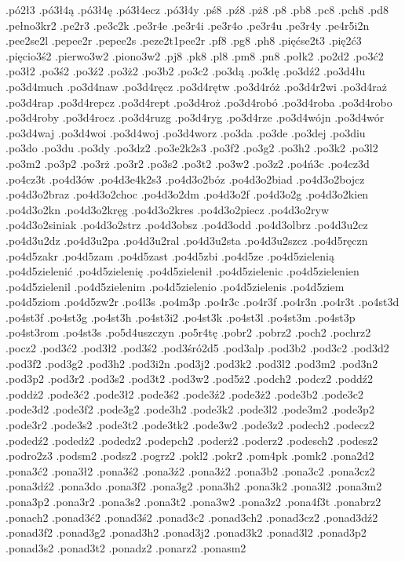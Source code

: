 {.pó2ł3
.pó3ł4ą
.pó3ł4ę
.pó3ł4ecz
.pó3ł4y
.pś8
.pź8
.pż8
.p8
.pb8
.pc8
.pch8
.pd8
.pełno3kr2
.pe2r3
.pe3c2k
.pe3r4e
.pe3r4i
.pe3r4o
.pe3r4u
.pe3r4y
.pe4r5i2n
.pee2se2l
.pepee2r
.pepee2s
.peze2t1pee2r
.pf8
.pg8
.ph8
.pięćse2t3
.pię2ć3
.pięcio3ś2
.pierwo3w2
.piono3w2
.pj8
.pk8
.pl8
.pm8
.pn8
.połk2
.po2d2
.po3ć2
.po3ł2
.po3ś2
.po3ź2
.po3ż2
.po3b2
.po3c2
.po3dą
.po3dę
.po3dź2
.po3d4łu
.po3d4much
.po3d4naw
.po3d4ręcz
.po3d4rętw
.po3d4róż
.po3d4r2wi
.po3d4raż
.po3d4rap
.po3d4repcz
.po3d4rept
.po3d4roż
.po3d4robó
.po3d4roba
.po3d4robo
.po3d4roby
.po3d4rocz
.po3d4ruzg
.po3d4ryg
.po3d4rze
.po3d4wójn
.po3d4wór
.po3d4waj
.po3d4woi
.po3d4woj
.po3d4worz
.po3da
.po3de
.po3dej
.po3diu
.po3do
.po3du
.po3dy
.po3dz2
.po3e2k2s3
.po3f2
.po3g2
.po3h2
.po3k2
.po3l2
.po3m2
.po3p2
.po3rż
.po3r2
.po3s2
.po3t2
.po3w2
.po3z2
.po4ń3c
.po4cz3d
.po4cz3t
.po4d3ów
.po4d3e4k2s3
.po4d3o2bóz
.po4d3o2biad
.po4d3o2bojcz
.po4d3o2braz
.po4d3o2choc
.po4d3o2dm
.po4d3o2f
.po4d3o2g
.po4d3o2kien
.po4d3o2kn
.po4d3o2kręg
.po4d3o2kres
.po4d3o2piecz
.po4d3o2ryw
.po4d3o2siniak
.po4d3o2strz
.po4d3obsz
.po4d3odd
.po4d3olbrz
.po4d3u2cz
.po4d3u2dz
.po4d3u2pa
.po4d3u2ral
.po4d3u2sta
.po4d3u2szcz
.po4d5ręczn
.po4d5zakr
.po4d5zam
.po4d5zast
.po4d5zbi
.po4d5ze
.po4d5zielenią
.po4d5zielenić
.po4d5zielenię
.po4d5zielenił
.po4d5zielenic
.po4d5zielenien
.po4d5zielenil
.po4d5zielenim
.po4d5zielenio
.po4d5zielenis
.po4d5ziem
.po4d5ziom
.po4d5zw2r
.po4l3s
.po4m3p
.po4r3c
.po4r3f
.po4r3n
.po4r3t
.po4st3d
.po4st3f
.po4st3g
.po4st3h
.po4st3i2
.po4st3k
.po4st3l
.po4st3m
.po4st3p
.po4st3rom
.po4st3s
.po5d4uszczyn
.po5r4tę
.pobr2
.pobrz2
.poch2
.pochrz2
.pocz2
.pod3ć2
.pod3ł2
.pod3ś2
.pod3śró2d5
.pod3alp
.pod3b2
.pod3c2
.pod3d2
.pod3f2
.pod3g2
.pod3h2
.pod3i2n
.pod3j2
.pod3k2
.pod3l2
.pod3m2
.pod3n2
.pod3p2
.pod3r2
.pod3s2
.pod3t2
.pod3w2
.pod5ż2
.podch2
.podcz2
.poddź2
.poddż2
.pode3ć2
.pode3ł2
.pode3ś2
.pode3ź2
.pode3ż2
.pode3b2
.pode3c2
.pode3d2
.pode3f2
.pode3g2
.pode3h2
.pode3k2
.pode3l2
.pode3m2
.pode3p2
.pode3r2
.pode3s2
.pode3t2
.pode3tk2
.pode3w2
.pode3z2
.podech2
.podecz2
.podedź2
.podedż2
.podedz2
.podepch2
.poderż2
.poderz2
.podesch2
.podesz2
.podro2z3
.podsm2
.podsz2
.pogrz2
.pokl2
.pokr2
.pom4pk
.pomk2
.pona2d2
.pona3ć2
.pona3ł2
.pona3ś2
.pona3ź2
.pona3ż2
.pona3b2
.pona3c2
.pona3cz2
.pona3dź2
.pona3do
.pona3f2
.pona3g2
.pona3h2
.pona3k2
.pona3l2
.pona3m2
.pona3p2
.pona3r2
.pona3s2
.pona3t2
.pona3w2
.pona3z2
.pona4f3t
.ponabrz2
.ponach2
.ponad3ć2
.ponad3ś2
.ponad3c2
.ponad3ch2
.ponad3cz2
.ponad3dź2
.ponad3f2
.ponad3g2
.ponad3h2
.ponad3j2
.ponad3k2
.ponad3l2
.ponad3p2
.ponad3s2
.ponad3t2
.ponadz2
.ponarz2
.ponasm2
}
